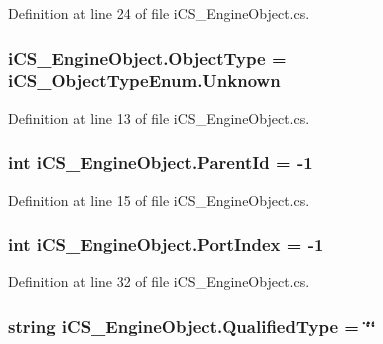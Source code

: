 Definition at line 24 of file i\+C\+S\+\_\+\+Engine\+Object.\+cs.

\hypertarget{classi_c_s___engine_object_ac3fa4f76b0a2e5ac665aaf1ff9be8ce8}{
\subsubsection[{Object\+Type}]{ i\+C\+S\+\_\+\+Engine\+Object.\+Object\+Type = {\bf i\+C\+S\+\_\+\+Object\+Type\+Enum.\+Unknown}}}\label{classi_c_s___engine_object_ac3fa4f76b0a2e5ac665aaf1ff9be8ce8}


Definition at line 13 of file i\+C\+S\+\_\+\+Engine\+Object.\+cs.

\hypertarget{classi_c_s___engine_object_abff4a026b7dd78aa1eec1d6cac051363}{
\subsubsection[{Parent\+Id}]{\setlength{\rightskip}{0pt plus 5cm}int i\+C\+S\+\_\+\+Engine\+Object.\+Parent\+Id = -\/1}}\label{classi_c_s___engine_object_abff4a026b7dd78aa1eec1d6cac051363}


Definition at line 15 of file i\+C\+S\+\_\+\+Engine\+Object.\+cs.

\hypertarget{classi_c_s___engine_object_a08fa0de7ebdd04da9e75c065da6656e8}{
\subsubsection[{Port\+Index}]{\setlength{\rightskip}{0pt plus 5cm}int i\+C\+S\+\_\+\+Engine\+Object.\+Port\+Index = -\/1}}\label{classi_c_s___engine_object_a08fa0de7ebdd04da9e75c065da6656e8}


Definition at line 32 of file i\+C\+S\+\_\+\+Engine\+Object.\+cs.

\hypertarget{classi_c_s___engine_object_afe4438ed340c068a9f86b24b53c5e2b0}{
\subsubsection[{Qualified\+Type}]{\setlength{\rightskip}{0pt plus 5cm}string i\+C\+S\+\_\+\+Engine\+Object.\+Qualified\+Type = \char`\"{}\char`\"{}}}\label{classi_c_s___engine_object_afe4438ed340c068a9f86b24b53c5e2b0}



